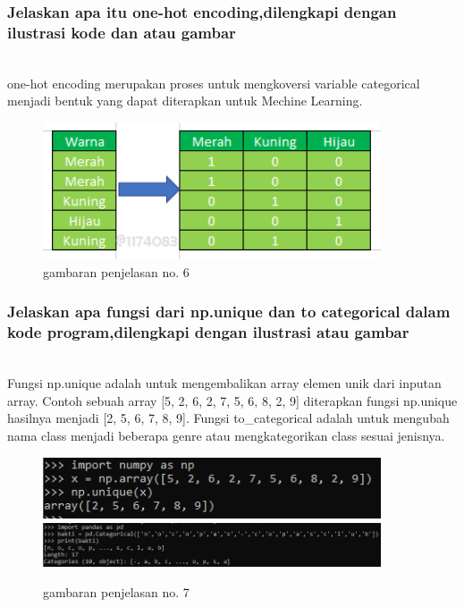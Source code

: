 \subsubsection{Jelaskan apa itu one-hot encoding,dilengkapi dengan ilustrasi kode dan atau gambar}
\hfill\\
one-hot encoding merupakan proses untuk mengkoversi variable categorical menjadi bentuk yang dapat diterapkan untuk Mechine Learning. 
\begin{figure}[H]
	\centering
	\includegraphics[width=10cm]{figures/1174083/figures6/6.png}
	\caption{gambaran penjelasan no. 6}
\end{figure}

\subsubsection{Jelaskan apa fungsi dari np.unique dan to categorical dalam kode program,dilengkapi dengan ilustrasi atau gambar}
\hfill\\
Fungsi np.unique adalah untuk mengembalikan array elemen unik dari inputan array. Contoh sebuah array [5, 2, 6, 2, 7, 5, 6, 8, 2, 9] diterapkan fungsi np.unique hasilnya menjadi [2, 5, 6, 7, 8, 9]. Fungsi to\_categorical adalah untuk mengubah nama class menjadi beberapa genre atau mengkategorikan class sesuai jenisnya.
\begin{figure}[H]
	\centering
	\includegraphics[width=10cm]{figures/1174083/figures6/7.png}
	\includegraphics[width=10cm]{figures/1174083/figures6/8.png}
	\caption{gambaran penjelasan no. 7}
\end{figure}


